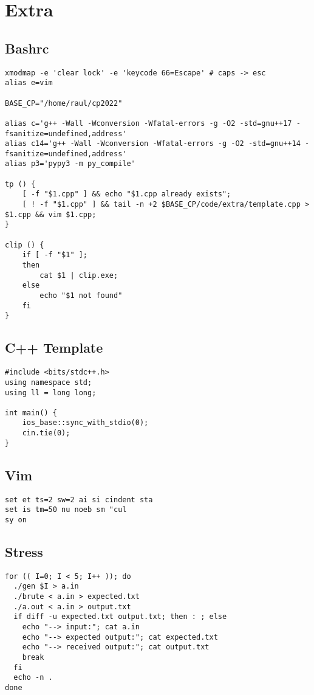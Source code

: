 \documentclass[12pt, a4paper, twoside]{article}
\begin{document}

\section{Extra}

\subsection{Bashrc}
\begin{lstlisting}
xmodmap -e 'clear lock' -e 'keycode 66=Escape' # caps -> esc
alias e=vim

BASE_CP="/home/raul/cp2022"

alias c='g++ -Wall -Wconversion -Wfatal-errors -g -O2 -std=gnu++17 -fsanitize=undefined,address'
alias c14='g++ -Wall -Wconversion -Wfatal-errors -g -O2 -std=gnu++14 -fsanitize=undefined,address'
alias p3='pypy3 -m py_compile'

tp () {
	[ -f "$1.cpp" ] && echo "$1.cpp already exists";
	[ ! -f "$1.cpp" ] && tail -n +2 $BASE_CP/code/extra/template.cpp > $1.cpp && vim $1.cpp;
}

clip () {
	if [ -f "$1" ];
	then
		cat $1 | clip.exe;
	else
		echo "$1 not found"
	fi
}
\end{lstlisting}

\subsection{C++ Template}
\begin{lstlisting}
#include <bits/stdc++.h>
using namespace std;
using ll = long long;

int main() {
	ios_base::sync_with_stdio(0);
	cin.tie(0);
}
\end{lstlisting}

\subsection{Vim}
\begin{lstlisting}
set et ts=2 sw=2 ai si cindent sta
set is tm=50 nu noeb sm "cul
sy on
\end{lstlisting}

\subsection{Stress}
\begin{lstlisting}
for (( I=0; I < 5; I++ )); do
  ./gen $I > a.in
  ./brute < a.in > expected.txt
  ./a.out < a.in > output.txt
  if diff -u expected.txt output.txt; then : ; else
    echo "--> input:"; cat a.in
    echo "--> expected output:"; cat expected.txt
    echo "--> received output:"; cat output.txt
    break
  fi
  echo -n .
done
\end{lstlisting}
\end{document}

